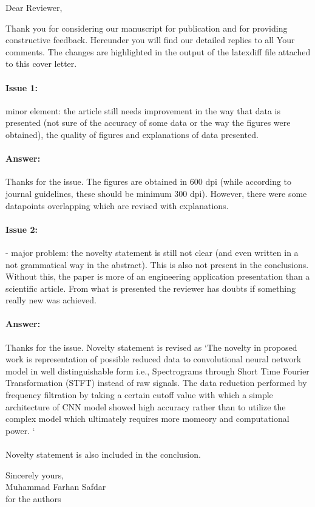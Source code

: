\documentclass{article}
\begin{document}
Dear Reviewer,

\vspace{0.25in}

Thank you for considering our manuscript for publication and for providing constructive feedback.
Hereunder you will find our detailed replies to all Your comments.
The changes are highlighted in the output of the latexdiff file attached to this cover letter.

\paragraph{Issue 1:}
\begin{displayquote}
minor element: the article still needs improvement in the way that data is presented (not sure of the accuracy of some data or the way the figures were obtained), the quality of figures and explanations of data presented.
\end{displayquote}

\paragraph{Answer:}
Thanks for the issue. The figures are obtained in 600 dpi (while according to journal guidelines, these should be minimum 300 dpi). However, there were some datapoints overlapping which are revised with explanations. 


\paragraph{Issue 2:}
\begin{displayquote}
- major problem: the novelty statement is still not clear (and even written in a not grammatical way in the abstract). This is also not present in the conclusions. Without this, the paper is more of an engineering application presentation than a scientific article. From what is presented the reviewer has doubts if something really new was achieved.
\end{displayquote}

\paragraph{Answer:}
Thanks for the issue. Novelty statement is revised as `The novelty in proposed work is representation of possible reduced data to convolutional neural network model in well distinguishable form i.e., Spectrograms through Short Time Fourier Transformation (STFT) instead of raw signals. The data reduction performed by frequency filtration by taking a certain cutoff value with which a simple architecture of CNN model showed high accuracy rather than to utilize the complex model which ultimately requires more momeory and computational power. `\\\\
Novelty statement is also included in the conclusion. 



\vspace{0.5cm}

Sincerely yours,\\
Muhammad Farhan Safdar\\
for the authors
\end{document}
